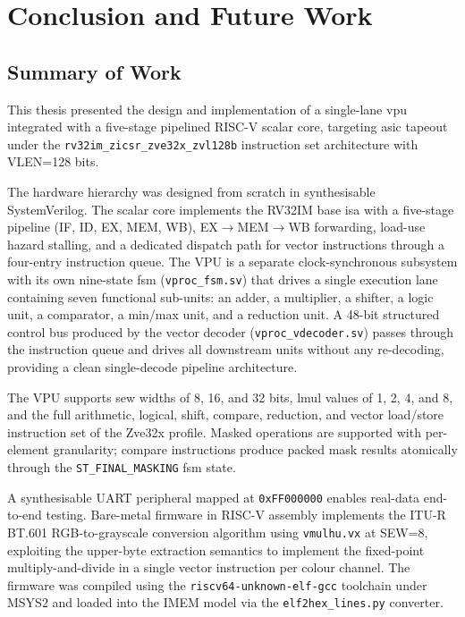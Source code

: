\chapter{Conclusion and Future Work}
\label{ch:conclusion}

\section{Summary of Work}
\label{sec:summary}

This thesis presented the design and implementation of a single-lane \gls{vpu}
integrated with a five-stage pipelined RISC-V scalar core, targeting \gls{asic} tapeout
under the \texttt{rv32im\_zicsr\_zve32x\_zvl128b} instruction set architecture with
VLEN=128 bits.

The hardware hierarchy was designed from scratch in synthesisable SystemVerilog. The
scalar core implements the RV32IM base \gls{isa} with a five-stage pipeline (IF, ID,
EX, MEM, WB), EX$\rightarrow$MEM$\rightarrow$WB forwarding, load-use hazard stalling,
and a dedicated dispatch path for vector instructions through a four-entry instruction
queue. The VPU is a separate clock-synchronous subsystem with its own nine-state
\gls{fsm} (\texttt{vproc\_fsm.sv}) that drives a single execution lane containing seven
functional sub-units: an adder, a multiplier, a shifter, a logic unit, a comparator,
a min/max unit, and a reduction unit. A 48-bit structured control bus produced by the
vector decoder (\texttt{vproc\_vdecoder.sv}) passes through the instruction queue and
drives all downstream units without any re-decoding, providing a clean single-decode
pipeline architecture.

The VPU supports \gls{sew} widths of 8, 16, and 32 bits, \gls{lmul} values of 1, 2, 4,
and 8, and the full arithmetic, logical, shift, compare, reduction, and vector
load/store instruction set of the Zve32x profile. Masked operations are supported with
per-element granularity; compare instructions produce packed mask results atomically
through the \texttt{ST\_FINAL\_MASKING} \gls{fsm} state.

A synthesisable UART peripheral mapped at \texttt{0xFF000000} enables real-data
end-to-end testing. Bare-metal firmware in RISC-V assembly implements the ITU-R BT.601
RGB-to-grayscale conversion algorithm using \texttt{vmulhu.vx} at SEW=8, exploiting
the upper-byte extraction semantics to implement the fixed-point multiply-and-divide
in a single vector instruction per colour channel. The firmware was compiled using the
\texttt{riscv64-unknown-elf-gcc} toolchain under MSYS2 and loaded into the IMEM model
via the \texttt{elf2hex\_lines.py} converter.

